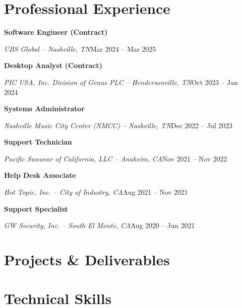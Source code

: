 \documentclass[a4paper]{article}
\begin{document}
\begin{minipage}[t]{0.62\textwidth}
  \raggedright
  \vspace*{0pt}

  \section{Professional Experience}
  \textbf{Software Engineer (Contract)}\par
  \textit{UBS Global -- Nashville, TN}\hfill Mar 2024 -- Mar 2025

  \vspace{0.5em}
  \textbf{Desktop Analyst (Contract)}\par
  \textit{PIC USA, Inc. Division of Genus PLC -- Hendersonville, TN}\hfill Oct 2023 -- Jan 2024

  \vspace{0.5em}
  \textbf{Systems Administrator}\par
  \textit{Nashville Music City Center (NMCC) -- Nashville, TN}\hfill Dec 2022 -- Jul 2023

  \vspace{0.5em}
  \textbf{Support Technician}\par
  \textit{Pacific Sunwear of California, LLC -- Anaheim, CA}\hfill Nov 2021 -- Nov 2022

  \vspace{0.5em}
  \textbf{Help Desk Associate}\par
  \textit{Hot Topic, Inc. -- City of Industry, CA}\hfill Aug 2021 -- Nov 2021

  \vspace{0.5em}
  \textbf{Support Specialist}\par
  \textit{GW Security, Inc. -- South El Monte, CA}\hfill Aug 2020 -- Jun 2021

  \section{Projects \& Deliverables}
  \begin{itemize}
    \appprojectsdeliverables{}
  \end{itemize}

  \section{Technical Skills}
  \begin{itemize}
    \apptechnicalskills{}
  \end{itemize}
\end{minipage}
\end{document}
